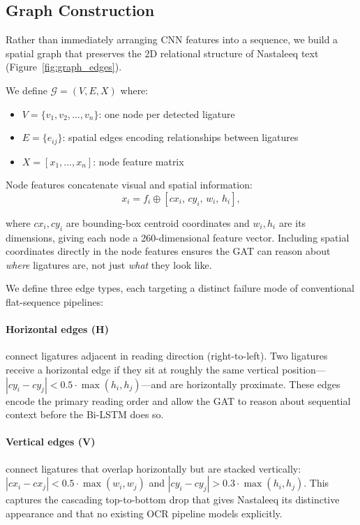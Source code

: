 \documentclass[11pt]{article}
\begin{document}
\subsection{Graph Construction}
\label{sec:graph}

Rather than immediately arranging CNN features into a sequence, we build a spatial graph
that preserves the 2D relational structure of Nastaleeq text
(Figure~\ref{fig:graph_edges}).

We define $\mathcal{G} = (V, E, X)$ where:
\begin{itemize}[nosep]
  \item $V = \{v_1, v_2, \ldots, v_n\}$: one node per detected ligature
  \item $E = \{e_{ij}\}$: spatial edges encoding relationships between ligatures
  \item $X = [x_1, \ldots, x_n]$: node feature matrix
\end{itemize}

Node features concatenate visual and spatial information:
\begin{equation}
  x_i = f_i \oplus [cx_i,\, cy_i,\, w_i,\, h_i],
  \label{eq:node_feat}
\end{equation}

where $cx_i, cy_i$ are bounding-box centroid coordinates and $w_i, h_i$ are its
dimensions, giving each node a 260-dimensional feature vector.
Including spatial coordinates directly in the node features ensures the GAT can reason
about \emph{where} ligatures are, not just \emph{what} they look like.

We define three edge types, each targeting a distinct failure mode of conventional
flat-sequence pipelines:

\paragraph{Horizontal edges (H)} connect ligatures adjacent in reading direction
(right-to-left).
Two ligatures receive a horizontal edge if they sit at roughly the same vertical
position---$|cy_i - cy_j| < 0.5 \cdot \max(h_i, h_j)$---and are horizontally
proximate.
These edges encode the primary reading order and allow the GAT to reason about
sequential context before the Bi-LSTM does so.

\paragraph{Vertical edges (V)} connect ligatures that overlap horizontally but are
stacked vertically: $|cx_i - cx_j| < 0.5 \cdot \max(w_i, w_j)$ and
$|cy_i - cy_j| > 0.3 \cdot \max(h_i, h_j)$.
This captures the cascading top-to-bottom drop that gives Nastaleeq its distinctive
appearance and that no existing OCR pipeline models explicitly.
\end{document}
